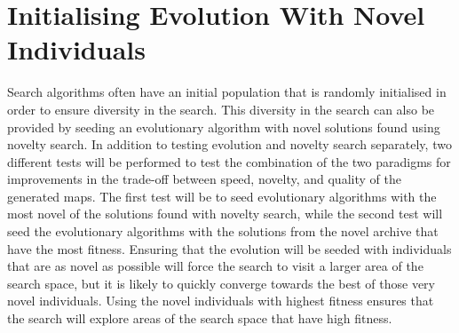 \section{Initialising Evolution With Novel Individuals}
\label{methodology_evolutionnovelseeds}
Search algorithms often have an initial population that is randomly initialised in order to ensure diversity in the search. This diversity in the search can also be provided by seeding an evolutionary algorithm with novel solutions found using novelty search. In addition to testing evolution and novelty search separately, two different tests will be performed to test the combination of the two paradigms for improvements in the trade-off between speed, novelty, and quality of the generated maps. The first test will be to seed evolutionary algorithms with the most novel of the solutions found with novelty search, while the second test will seed the evolutionary algorithms with the solutions from the novel archive that have the most fitness. Ensuring that the evolution will be seeded with individuals that are as novel as possible will force the search to visit a larger area of the search space, but it is likely to quickly converge towards the best of those very novel individuals. Using the novel individuals with highest fitness ensures that the search will explore areas of the search space that have high fitness.